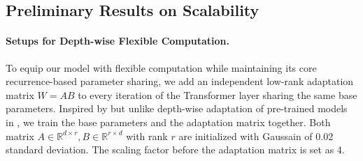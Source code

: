 \begin{table}[htbp]
\caption{Alternative designs on feedforward energy $E_\text{FF}$ and the induced operators.}
\label{tab:generalized feedforward}
\centering
{}
\end{table}

\subsection{Preliminary Results on Scalability}
\label{section:scalability}
\paragraph{Setups for Depth-wise Flexible Computation.} To equip our model with flexible computation while maintaining its core recurrence-based parameter sharing, we add an independent low-rank adaptation \citep{hu2022lora} matrix $W=AB$ to every iteration of the Transformer layer sharing the same base parameters. Inspired by but unlike depth-wise adaptation of pre-trained models in \citet{bae2025relaxed}, we train the base parameters and the adaptation matrix together. Both matrix $A \in \mathbb{R}^{d\times r},B \in \mathbb{R}^{r\times d}$ with rank $r$ are initialized with Gaussain of 0.02 standard deviation. The scaling factor before the adaptation matrix is set as 4.

